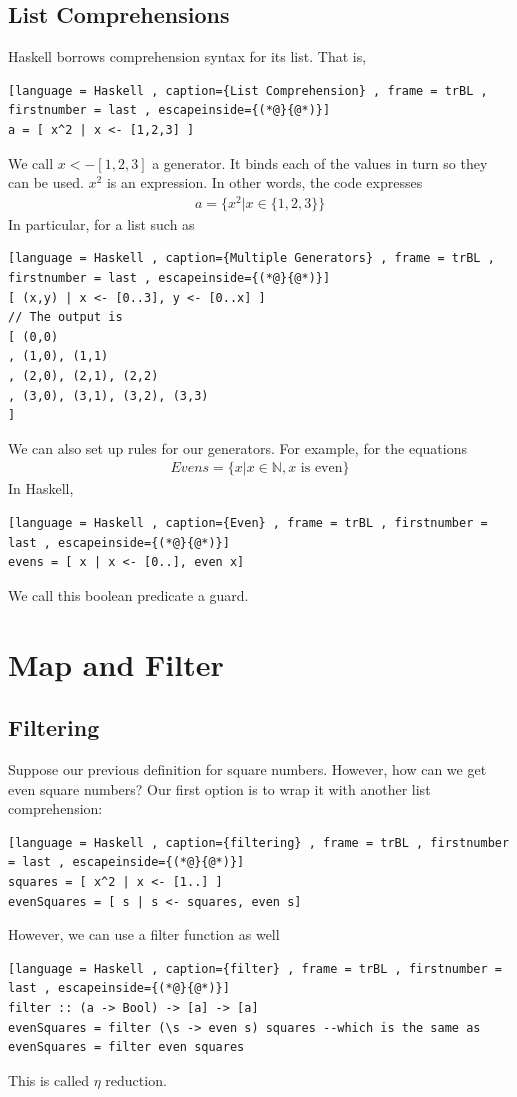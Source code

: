 \documentclass[a4paper]{article}
\theoremstyle{plain}
\theoremstyle{definition}
\theoremstyle{remark}
\begin{document}
\subsection{List Comprehensions}
Haskell borrows comprehension syntax for its list. That is,
\begin{lstlisting}[language = Haskell , caption={List Comprehension} , frame = trBL , firstnumber = last , escapeinside={(*@}{@*)}]
a = [ x^2 | x <- [1,2,3] ]
\end{lstlisting}
We call $x <- [1,2,3]$ a generator. It binds each of the values in turn so they can be used. $x^2$ is an expression. In other words, the code expresses
\begin{align*}
	a = \{ x^2 | x \in \{ 1,2,3 \} \}
\end{align*}
In particular, for a list such as 
\begin{lstlisting}[language = Haskell , caption={Multiple Generators} , frame = trBL , firstnumber = last , escapeinside={(*@}{@*)}]
[ (x,y) | x <- [0..3], y <- [0..x] ]
// The output is
[ (0,0)
, (1,0), (1,1)
, (2,0), (2,1), (2,2)
, (3,0), (3,1), (3,2), (3,3)
]
\end{lstlisting}
We can also set up rules for our generators. For example, for the equations
\begin{align*}
	Evens = \{ x | x \in \mathbb{N}, \text{$x$ is even} \}
\end{align*}
In Haskell,
\begin{lstlisting}[language = Haskell , caption={Even} , frame = trBL , firstnumber = last , escapeinside={(*@}{@*)}]
evens = [ x | x <- [0..], even x]
\end{lstlisting}
We call this boolean predicate a guard.
\section{Map and Filter}
\subsection{Filtering}
Suppose our previous definition for square numbers. However, how can we get even square numbers?
Our first option is to wrap it with another list comprehension:
\begin{lstlisting}[language = Haskell , caption={filtering} , frame = trBL , firstnumber = last , escapeinside={(*@}{@*)}]
squares = [ x^2 | x <- [1..] ]
evenSquares = [ s | s <- squares, even s]
\end{lstlisting}
However, we can use a filter function as well
\begin{lstlisting}[language = Haskell , caption={filter} , frame = trBL , firstnumber = last , escapeinside={(*@}{@*)}]
filter :: (a -> Bool) -> [a] -> [a]
evenSquares = filter (\s -> even s) squares --which is the same as
evenSquares = filter even squares
\end{lstlisting}
This is called $\eta$ reduction. 
\end{document}
